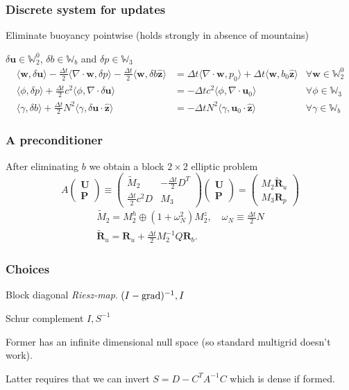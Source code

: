 \documentclass[presentation]{beamer}
\renewcommand{\vec}[1]{\ensuremath{\boldsymbol{#1}}}
\newcommand{\zhat}{\hat{\vec{z}}}
\newcommand{\W}{\ensuremath{\mathbb{W}}}
\DeclareMathOperator{\grad}{grad}
\let\div\relax
\DeclareMathOperator{\div}{div}
\begin{document}
\begin{frame}
  \frametitle{Discrete system for updates}
Eliminate buoyancy pointwise (holds strongly in absence of mountains)

$\delta \vec{u}\in \W_2^0$, $\delta b\in\W_b$ and
$\delta p\in\W_3$
\begin{align*}
  \langle\vec{w},\delta\vec{u}\rangle
  - \frac{\Delta t}{2}\langle\nabla\cdot\vec{w},\delta p\rangle
  - \frac{\Delta t}{2}\langle\vec{w},\delta b\zhat\rangle
  &= \Delta t \langle\nabla\cdot\vec{w},p_0\rangle
  + \Delta t \langle\vec{w},b_0\zhat\rangle
   &\forall \vec{w}\in\W_2^0
 \\
  \langle\phi,\delta p\rangle
  +\frac{\Delta t}{2}c^2\langle\phi,\nabla\cdot\delta\vec{u}\rangle
  &= -\Delta tc^2\langle\phi,\nabla\cdot\vec{u}_0\rangle
   &\forall \phi\in\W_3
  \\
  \langle\gamma,\delta b\rangle
  + \frac{\Delta t }{2}N^2\langle\gamma,\delta\vec{u}\cdot\zhat\rangle
  &= -\Delta t N^2\langle\gamma,\vec{u}_0\cdot\zhat\rangle
   &\forall \gamma\in\W_b
\end{align*}
\end{frame}

\begin{frame}
  \frametitle{A preconditioner}
  After eliminating $b$ we obtain a block $2\times2$ elliptic problem
\begin{equation}
  A\begin{pmatrix}\vec{U}\\[1ex]\vec{P}\end{pmatrix}
  \equiv
  \begin{pmatrix}
   \tilde{M}_2 & -\frac{\Delta t}{2}D^T  \\[1ex]
   \frac{\Delta t}{2}c^2 D & M_3
  \end{pmatrix}
  \begin{pmatrix}\vec{U}\\[1ex]\vec{P}\end{pmatrix}
 =
\begin{pmatrix}M_2\tilde{\vec{R}}_u\\[1ex]M_3\vec{R}_p\end{pmatrix}
\end{equation}
\begin{equation}
  \label{eq:2}
\begin{matrix}
\tilde{M}_2 = M_2^h \oplus (1+ \omega_N^2) M_2^z, \quad \omega_N \equiv \frac{\Delta t}{2}N
\\[1ex]
\tilde{\vec{R}}_u = \vec{R}_u+\frac{\Delta t}{2}M_2^{-1}Q\vec{R}_b.
\end{matrix}
\end{equation}
\end{frame}
\begin{frame}
  \frametitle{Choices}
  Block diagonal \emph{Riesz-map}.  $(I - \grad\div)^{-1}, I$

  Schur complement $I, S^{-1}$

  Former has an infinite dimensional null space (so standard multigrid
  doesn't work).

  Latter requires that we can invert $S = D - C^T A^{-1} C$ which is
  dense if formed.
\end{frame}
\end{document}
